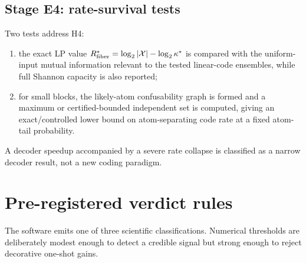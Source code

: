 \documentclass[11pt]{article}
\theoremstyle{definition}
\theoremstyle{remark}
\newcommand{\X}{\mathcal X}
\begin{document}
\subsection{Stage E4: rate-survival tests}

Two tests address H4:
\begin{enumerate}
\item the exact LP value $R_{\rm fiber}^*=\log_2|\X|-\log_2\kappa^*$ is compared with the uniform-input mutual information relevant to the tested linear-code ensembles, while full Shannon capacity is also reported;
\item for small blocks, the likely-atom confusability graph is formed and a maximum or certified-bounded independent set is computed, giving an exact/controlled lower bound on atom-separating code rate at a fixed atom-tail probability.
\end{enumerate}

A decoder speedup accompanied by a severe rate collapse is classified as a narrow decoder result, not a new coding paradigm.

\section{Pre-registered verdict rules}

The software emits one of three scientific classifications. Numerical thresholds are deliberately modest enough to detect a credible signal but strong enough to reject decorative one-shot gains.
\end{document}
